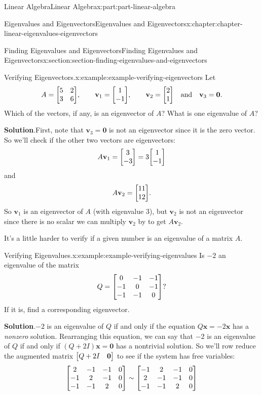 \documentclass[twoside,10pt,]{book}
\newcommand{\blocktitlefont}{\relax}
\numberwithin{equation}{part}
\providecommand{\vb}[1]{\mathbf{#1}}
\begin{document}
\begin{partptx}{Linear Algebra}{}{Linear Algebra}{}{}{x:part:part-linear-algebra}
\begin{chapterptx}{Eigenvalues and Eigenvectors}{}{Eigenvalues and Eigenvectors}{}{}{x:chapter:chapter-linear-eigenvalues-eigenvectors}
\begin{sectionptx}{Finding Eigenvalues and Eigenvectors}{}{Finding Eigenvalues and Eigenvectors}{}{}{x:section:section-finding-eigenvalues-and-eigenvectors}
\begin{example}{Verifying Eigenvectors.}{x:example:example-verifying-eigenvectors}
Let%
\begin{equation*}
A = \mqty[5 & 2 \\ 3 & 6],\qq{}\vb{v}_{1} = \mqty[1 \\ -1],\qq{}\vb{v}_{2} = \mqty[2 \\ 1]\qq{and}\vb{v}_{3} = \vb{0}.
\end{equation*}
Which of the vectors, if any, is an eigenvector of \(A\)? What is one eigenvalue of \(A\)?%
\par\smallskip%
\noindent\textbf{\blocktitlefont Solution}.\hypertarget{g:solution:idm1630923320}{}\quad{}First, note that \(\vb{v}_{3} = \vb{0}\) is not an eigenvector since it is the zero vector. So we'll check if the other two vectors are eigenvectors:%
\begin{equation*}
A\vb{v}_{1} = \mqty[3 \\ -3] = 3\mqty[1 \\ -1]
\end{equation*}
and%
\begin{equation*}
A\vb{v}_{2} = \mqty[11 \\ 12].
\end{equation*}
So \(\vb{v}_{1}\) is an eigenvector of \(A\) (with eigenvalue \(3\)), but \(\vb{v}_{2}\) is not an eigenvector since there is no scalar we can multiply \(\vb{v}_{2}\) by to get \(A\vb{v}_{2}\).%
\end{example}
It's a little harder to verify if a given number is an eigenvalue of a matrix \(A\).%
\begin{example}{Verifying Eigenvalues.}{x:example:example-verifying-eigenvalues}%
Is \(-2\) an eigenvalue of the matrix%
\begin{equation*}
Q = \mqty[0 & -1 & -1 \\ -1 & 0 & -1 \\ -1 & -1 & 0]?
\end{equation*}
If it is, find a corresponding eigenvector.%
\par\smallskip%
\noindent\textbf{\blocktitlefont Solution}.\hypertarget{g:solution:idm1630917176}{}\quad{}\(-2\) is an eigenvalue of \(Q\) if and only if the equation \(Q\vb{x} = -2\vb{x}\) has a \emph{nonzero} solution. Rearranging this equation, we can say that \(-2\) is an eigenvalue of \(Q\) if and only if \((Q+2I)\vb{x} = \vb{0}\) has a nontrivial solution. So we'll row reduce the augmented matrix \(\mqty[Q+2I & \vb{0}]\) to see if the system has free variables:%
\begin{align*}
\mqty[2 & -1 & -1 & 0 \\ -1 & 2 & -1 & 0 \\ -1 & -1 & 2 & 0] &\sim\mqty[-1 & 2 & -1 & 0 \\ 2 & -1 & -1 & 0 \\ -1 & -1 & 2 & 0]\\

\end{align*}
\end{example}
\end{sectionptx}
\end{chapterptx}
\end{partptx}
\end{document}
